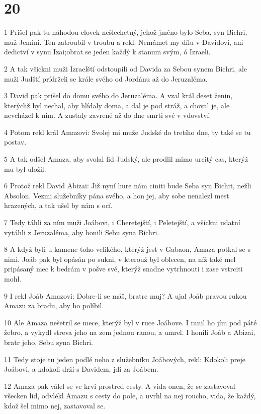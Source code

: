 \chapter{20}

\par 1 Prišel pak tu náhodou clovek nešlechetný, jehož jméno bylo Seba, syn Bichri, muž Jemini. Ten zatroubil v troubu a rekl: Nemámet my dílu v Davidovi, ani dedictví v synu Izai;obrat se jeden každý k stanum svým, ó Izraeli.
\par 2 A tak všickni muži Izraelští odstoupili od Davida za Sebou synem Bichri, ale muži Judští prídrželi se krále svého od Jordánu až do Jeruzaléma.
\par 3 David pak prišel do domu svého do Jeruzaléma. A vzal král deset ženin, kterýchž byl nechal, aby hlídaly doma, a dal je pod stráž, a choval je, ale nevcházel k nim. A zustaly zavrené až do dne smrti své v vdovství.
\par 4 Potom rekl král Amazovi: Svolej mi muže Judské do tretího dne, ty také se tu postav.
\par 5 A tak odšel Amaza, aby svolal lid Judský, ale prodlil mimo urcitý cas, kterýž mu byl uložil.
\par 6 Protož rekl David Abizai: Již nyní hure nám ciniti bude Seba syn Bichri, nežli Absolon. Vezmi služebníky pána svého, a hon jej, aby sobe nenalezl mest hrazených, a tak ušel by nám s ocí.
\par 7 Tedy táhli za ním muži Joábovi, i Cheretejští, i Peletejští, a všickni udatní vytáhli z Jeruzaléma, aby honili Sebu syna Bichri.
\par 8 A když byli u kamene toho velikého, kterýž jest v Gabaon, Amaza potkal se s nimi. Joáb pak byl opásán po sukni, v kterouž byl oblecen, na níž také mel pripásaný mec k bedrám v pošve své, kterýž snadne vytrhnouti i zase vstrciti mohl.
\par 9 I rekl Joáb Amazovi: Dobre-li se máš, bratre muj? A ujal Joáb pravou rukou Amazu za bradu, aby ho políbil.
\par 10 Ale Amaza nešetril se mece, kterýž byl v ruce Joábove. I ranil ho jím pod páté žebro, a vykydl streva jeho na zem jednou ranou, a umrel. I honili Joáb a Abizai, bratr jeho, Sebu syna Bichri.
\par 11 Tedy stoje tu jeden podlé neho z služebníku Joábových, rekl: Kdokoli preje Joábovi, a kdokoli drží s Davidem, jdi za Joábem.
\par 12 Amaza pak válel se ve krvi prostred cesty. A vida onen, že se zastavoval všecken lid, odvlékl Amazu s cesty do pole, a uvrhl na nej roucho, vida, že každý, kdož šel mimo nej, zastavoval se.
